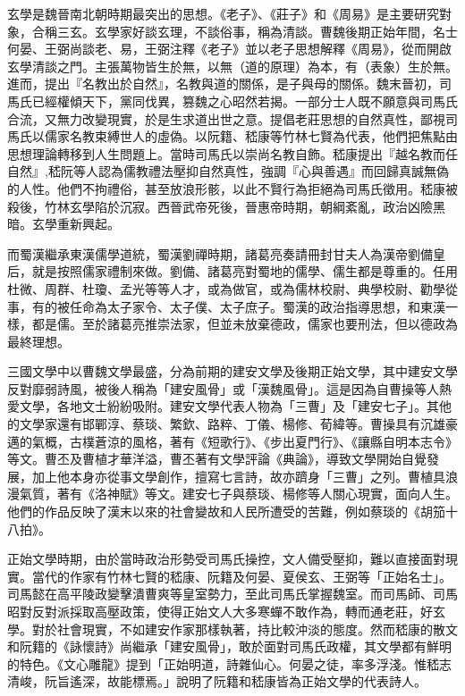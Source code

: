 玄學是魏晉南北朝時期最突出的思想。《老子》、《莊子》和《周易》是主要研究對象，合稱三玄。玄學家好談玄理，不談俗事，稱為清談。曹魏後期正始年間，名士何晏、王弼尚談老、易，王弼注釋《老子》並以老子思想解釋《周易》，從而開啟玄學清談之門。主張萬物皆生於無，以無（道的原理）為本，有（表象）生於無。進而，提出『名教出於自然』，名教與道的關係，是子與母的關係。魏末晉初，司馬氏已經權傾天下，黨同伐異，篡魏之心昭然若揭。一部分士人既不願意與司馬氏合流，又無力改變現實，於是生求道出世之意。提倡老莊思想的自然真性，鄙視司馬氏以儒家名教束縛世人的虛偽。以阮籍、嵇康等竹林七賢為代表，他們把焦點由思想理論轉移到人生問題上。當時司馬氏以崇尚名教自飾。嵇康提出『越名教而任自然』,嵇阮等人認為儒教禮法壓抑自然真性，強調『心與善遇』而回歸真誠無偽的人性。他們不拘禮俗，甚至放浪形骸，以此不賢行為拒絕為司馬氏徵用。嵇康被殺後，竹林玄學陷於沉寂。西晉武帝死後，晉惠帝時期，朝綱紊亂，政治凶險黑暗。玄學重新興起。

而蜀漢繼承東漢儒學道統，蜀漢劉禪時期，諸葛亮奏請冊封甘夫人為漢帝劉備皇后，就是按照儒家禮制來做。劉備、諸葛亮對蜀地的儒學、儒生都是尊重的。任用杜微、周群、杜瓊、孟光等等人才，或為做官，或為儒林校尉、典學校尉、勸學從事，有的被任命為太子家令、太子僕、太子庶子。蜀漢的政治指導思想，和東漢一樣，都是儒。至於諸葛亮推崇法家，但並未放棄德政，儒家也要刑法，但以德政為最終理想。

三國文學中以曹魏文學最盛，分為前期的建安文學及後期正始文學，其中建安文學反對靡弱詩風，被後人稱為「建安風骨」或「漢魏風骨」。這是因為自曹操等人熱愛文學，各地文士紛紛吸附。建安文學代表人物為「三曹」及「建安七子」。其他的文學家還有邯鄲淳、蔡琰、繁欽、路粹、丁儀、楊修、荀緯等。曹操具有沉雄豪邁的氣概，古樸蒼涼的風格，著有《短歌行》、《步出夏門行》、《讓縣自明本志令》等文。曹丕及曹植才華洋溢，曹丕著有文學評論《典論》，導致文學開始自覺發展，加上他本身亦從事文學創作，擅寫七言詩，故亦躋身「三曹」之列。曹植具浪漫氣質，著有《洛神賦》等文。建安七子與蔡琰、楊修等人關心現實，面向人生。他們的作品反映了漢末以來的社會變故和人民所遭受的苦難，例如蔡琰的《胡笳十八拍》。

正始文學時期，由於當時政治形勢受司馬氏操控，文人備受壓抑，難以直接面對現實。當代的作家有竹林七賢的嵇康、阮籍及何晏、夏侯玄、王弼等「正始名士」。司馬懿在高平陵政變擊潰曹爽等皇室勢力，至此司馬氏掌握魏室。而司馬師、司馬昭對反對派採取高壓政策，使得正始文人大多寒蟬不敢作為，轉而通老莊，好玄學。對於社會現實，不如建安作家那樣執著，持比較沖淡的態度。然而嵇康的散文和阮籍的《詠懷詩》尚繼承「建安風骨」，敢於面對司馬氏政權，其文學都有鮮明的特色。《文心雕龍》提到「正始明道，詩雜仙心。何晏之徒，率多浮淺。惟嵇志清峻，阮旨遙深，故能標焉。」說明了阮籍和嵇康皆為正始文學的代表詩人。


